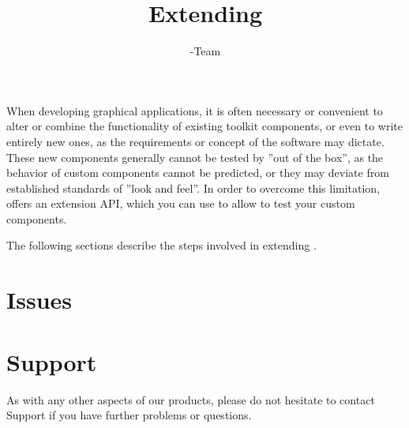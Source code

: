 \documentclass[en,twoside,manual,guidancer]{bxreport}
\begin{document}
%
\title{Extending \GD}
\author*{\GD-Team}{}
\maketitle

\setcounter{tocdepth}{2}
\tableofcontents
\renewcommand{\bxcomment}[2]{}%
\clearpage

\setcounter{secnumdepth}{2}

When developing graphical applications, it is often necessary or
convenient to alter or combine the functionality of existing toolkit
components, or even to write entirely new ones, as the requirements or
concept of the software may dictate. These new components
generally cannot be tested by \GD{} ''out of the box'', as the
behavior of custom components cannot be predicted, or they may deviate
from established standards of ''look and feel''. In order to overcome this limitation, \GD{} offers an extension
API, which you can use to allow \GD to test your custom components.

The following sections describe the steps involved in extending
\GD{}.

\clearpage



\clearpage

\chapter{Issues}


\clearpage
\chapter{Support}

As with any other aspects of our products, please do not hesitate to
contact \GD Support if you have further problems or questions.

\clearpage
\end{document}
